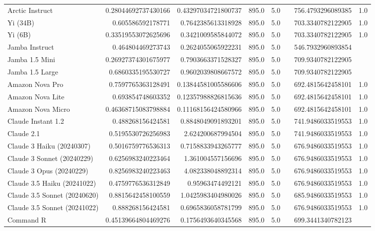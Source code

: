 \begin{table}[htp]
{\begin{tabular}{lrrrrrrr}
Arctic Instruct & 0.28044692737430166 & 0.43297034721800737 & 895.0 & 5.0 &  & 756.4793296089385 & 1.0 \\
Yi (34B) & 0.605586592178771 & 0.7642385613318928 & 895.0 & 5.0 &  & 703.3340782122905 & 1.0 \\
Yi (6B) & 0.33519553072625696 & 0.3421009585844072 & 895.0 & 5.0 &  & 703.3340782122905 & 1.0 \\
Jamba Instruct & 0.464804469273743 & 0.2624055065922231 & 895.0 & 5.0 &  & 546.7932960893854 &  \\
Jamba 1.5 Mini & 0.26927374301675977 & 0.7903663371528327 & 895.0 & 5.0 &  & 709.9340782122905 &  \\
Jamba 1.5 Large & 0.6860335195530727 & 0.9602039808667572 & 895.0 & 5.0 &  & 709.9340782122905 &  \\
Amazon Nova Pro & 0.7597765363128491 & 0.13844581005586606 & 895.0 & 5.0 &  & 692.4815642458101 & 1.0 \\
Amazon Nova Lite & 0.693854748603352 & 0.12357988826815636 & 895.0 & 5.0 &  & 692.4815642458101 & 1.0 \\
Amazon Nova Micro & 0.46368715083798884 & 0.11168156424580966 & 895.0 & 5.0 &  & 692.4815642458101 & 1.0 \\
Claude Instant 1.2 & 0.488268156424581 & 0.8848049091893201 & 895.0 & 5.0 &  & 741.9486033519553 & 1.0 \\
Claude 2.1 & 0.5195530726256983 & 2.624200687994504 & 895.0 & 5.0 &  & 741.9486033519553 & 1.0 \\
Claude 3 Haiku (20240307) & 0.5016759776536313 & 0.7158833943265777 & 895.0 & 5.0 &  & 676.9486033519553 & 1.0 \\
Claude 3 Sonnet (20240229) & 0.6256983240223464 & 1.361004557156696 & 895.0 & 5.0 &  & 676.9486033519553 & 1.0 \\
Claude 3 Opus (20240229) & 0.8256983240223463 & 4.082338048892314 & 895.0 & 5.0 &  & 676.9486033519553 & 1.0 \\
Claude 3.5 Haiku (20241022) & 0.4759776536312849 & 0.95963474492121 & 895.0 & 5.0 &  & 676.9486033519553 & 1.0 \\
Claude 3.5 Sonnet (20240620) & 0.8815642458100559 & 1.0425983404980026 & 895.0 & 5.0 &  & 685.9486033519553 & 1.0 \\
Claude 3.5 Sonnet (20241022) & 0.888268156424581 & 0.6965836058781799 & 895.0 & 5.0 &  & 676.9486033519553 & 1.0 \\
Command R & 0.45139664804469276 & 0.1756493640345568 & 895.0 & 5.0 &  & 699.3441340782123 &  \\

\end{tabular}}
\end{table}
